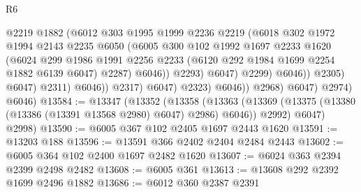 \begin{lexlean}{R6}
\begin{coremodule}
                                        @2219
                                        @1882
                                        (@6012
                                          @303
                                          @1995
                                          @1999
                                          @2236
                                          @2219
                                          (@6018
                                            @302
                                            @1972
                                            @1994
                                            @2143
                                            @2235
                                            @6050
                                            (@6005
                                              @300
                                              @102
                                              @1992
                                              @1697
                                              @2233
                                              @1620
                                              (@6024
                                                @299
                                                @1986
                                                @1991
                                                @2256
                                                @2233
                                                (@6120 @292 @1984 @1699 @2254 @1882 @6139 @6047)
                                                @2287)
                                              @6046))
                                          @2293)
                                        @6047)
                                      @2299)
                                    @6046))
                                @2305)
                              @6047)
                            @2311)
                          @6046))
                      @2317)
                    @6047)
                  @2323)
                @6046))
            @2968)
          @6047)
        @2974)
      @6046)
@13584 := @13347
    (@13352
      (@13358
        (@13363 (@13369 (@13375 (@13380 (@13386 (@13391 @13568 @2980) @6047) @2986) @6046)) @2992)
        @6047)
      @2998)
@13590 := @6005 @367 @102 @2405 @1697 @2443 @1620
@13591 := @13203 @188
@13596 := @13591 @366 @2402 @2404 @2484 @2443
@13602 := @6005 @364 @102 @2400 @1697 @2482 @1620
@13607 := @6024 @363 @2394 @2399 @2498 @2482
@13608 := @6005 @361
@13613 := @13608 @292 @2392 @1699 @2496 @1882
@13686 := @6012
    @360
    @2387
    @2391

\end{coremodule}
\end{lexlean}
